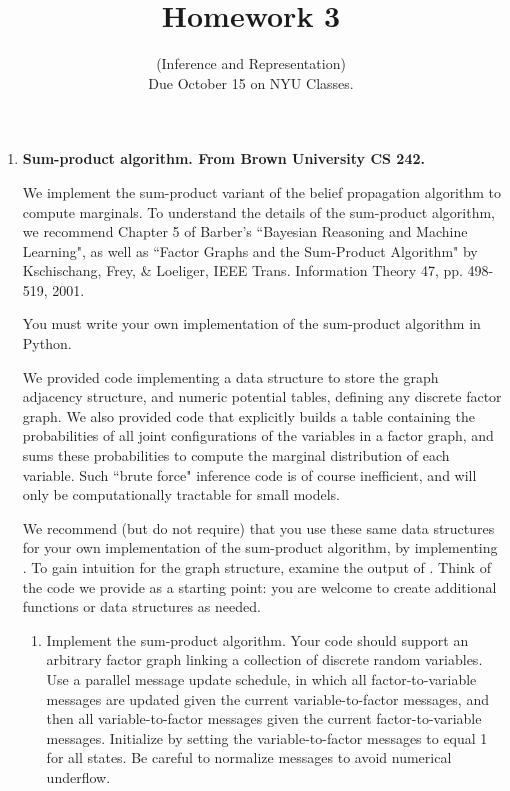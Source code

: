 \documentclass{article}
\date{}
\title{Homework 3}
\author{(Inference and Representation) 
\\ Due October 15 on NYU Classes.  }
\begin{document}
\maketitle

\begin{enumerate}


\item {\bf Sum-product algorithm. From Brown University CS 242.} 

We implement the sum-product variant of the belief propagation algorithm to compute marginals. To understand the details of the sum-product algorithm, we recommend Chapter 5 of Barber's ``Bayesian Reasoning and Machine Learning", as well as ``Factor Graphs and the Sum-Product Algorithm" by Kschischang, Frey, \& Loeliger, IEEE Trans. Information Theory 47, pp. 498-519, 2001.

You must write your own  implementation of the sum-product algorithm in Python.

We  provided code implementing a data structure to store the graph adjacency structure, and numeric potential tables, defining any discrete factor graph. We also provided code that explicitly builds a table containing the probabilities of all joint configurations of the variables in a factor graph, and sums these probabilities to compute the marginal
distribution of each variable. Such ``brute force" inference code is of course inefficient, and will only be computationally tractable for small models.

We recommend (but do not require) that you use these same data structures for your own implementation of the sum-product algorithm, by implementing . To gain intuition for the graph structure, examine the output of . Think of the code we provide as a starting point: you are welcome to create additional functions or data structures as needed. 

\begin{enumerate}
\item Implement the sum-product algorithm. Your code should support an arbitrary factor graph linking a collection of discrete random variables. Use a parallel message update schedule,
in which all factor-to-variable messages are updated given the current variable-to-factor messages, and then all variable-to-factor messages given the current factor-to-variable
messages. Initialize by setting the variable-to-factor messages to equal 1 for all states.
Be careful to normalize messages to avoid numerical underflow.



\end{enumerate}
\end{enumerate}
\end{document}
